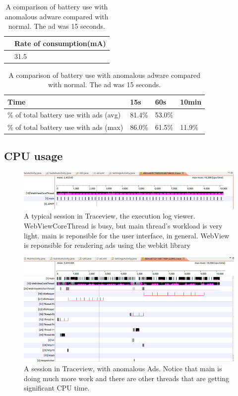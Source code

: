 \begin{table}[ht]
\centering 
\scriptsize
\begin{tabular}{|l|l|}
  \hline
  {} & {Rate of consumption(mA)} \\
  \hline
  {} & {31.5}\\
\end{tabular}

\begin{tabular}{|l||l|l|l|}
    \hline
    {\bf Time} & {\bf 15s} & {\bf 60s} & {\bf 10min} \\
    \hline
    \% of total battery use with ads (avg)  & 81.4\%   & 53.0\%   & \\
    \hline
    \% of total battery use with ads (max) & 86.0\%  & 61.5\%  & 11.9\%  \\
    \hline

\end{tabular}
\caption{A comparison of battery use with anomalous adware compared with normal.
The ad was 15 seconds.}
\label{table:battery}
\end{table}

\subsection{CPU usage}

\begin{figure}[ht]
\centering
\includegraphics[width=6in]{no_AdsDisplay_10s.png}
\caption{A typical session in Traceview, the execution log viewer.
WebViewCoreThread is busy, but main thread's workload is very light.  main is reponsible for 
the user interface, in general.  WebView is reponsible for rendering ads using the webkit library}
\label{fig:cpu-no-ad}
\end{figure}

\begin{figure}[ht]
\centering
\includegraphics[width=6in]{traceview.png}
\caption{A session in Traceview, with anomalous Ads.  Notice that main is doing much more work and
there are other threads that are getting significant CPU time.}
\label{fig:cpu-ad}
\end{figure}


